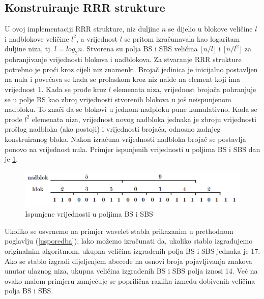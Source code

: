 \subsection{Konstruiranje RRR strukture}
U ovoj implementaciji RRR strukture, niz duljine $n$ se dijelio u blokove veličine $l$ i nadblokove veličine $l^2$, a vrijednost $l$ se pritom izračunavala kao logaritam duljine niza, tj. $l=log_2 n$. Stvorena su polja BS i SBS veličina $\lfloor n/l \rfloor$ i $\lfloor n/l^{2} \rfloor$ za pohranjivanje vrijednosti blokova i nadblokova. Za stvaranje RRR strukture potrebno je proći kroz cijeli niz znamenki. Brojač jedinica je inicijalno postavljen na nula i povećava se kada se prolaskom kroz niz naiđe na element koji ima vrijednost 1. Kada se prođe kroz $l$ elemenata niza, vrijednost brojača pohranjuje se u polje BS kao zbroj vrijednosti stvorenih blokova u još neispunjenom nadbloku. To znači da se blokovi u jednom nadploku pune kumulativno. Kada se prođe $l^2$ elemenata niza, vrijednost novog nadbloka jednaka je zbroju vrijednosti prošlog nadbloka (ako postoji) i vrijednosti brojača, odnosno zadnjeg konstruiranog bloka. Nakon izračuna vrijednosti nadbloka brojač se postavlja ponovo na vrijednost nula. Primjer ispunjenih vrijednosti u poljima BS i SBS dan je \ref{rrr1}.

\begin{figure}[H]
\centering
\includegraphics[width=\linewidth]{./pictures/rrr1.png}
\caption{Ispunjene vrijednosti u poljima BS i SBS}\label{rrr1}
\end{figure}

Ukoliko se osvrnemo na primjer wavelet stabla prikazanim u prethodnom poglavlju (\ref{usporedba}), lako možemo izračunati da, ukoliko stablo izgrađujemo originalnim algoritmom, ukupna veličina izgrađenih polja BS i SBS jednaka je 17. Ako se stablo izgradi dijeljenjem abecede na osnovi broja pojavljivanja znakova unutar ulaznog niza, ukupna veličina izgrađenih BS i SBS polja iznosi 14. Već na ovako malom primjeru zamjećuje se poprilična razlika između dobivenih veličina polja BS i SBS.


